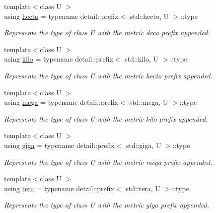 \begin{DoxyCompactItemize}
{\footnotesize template$<$class U $>$ }\\using \hyperlink{group___unit_manipulators_gaf3fc3cf9567ce9a93f880419c4ddac46}{hecto} = typename detail\+::prefix$<$ std\+::hecto, U $>$\+::type
\begin{DoxyCompactList}\small\item\em Represents the type of {\ttfamily class U} with the metric \textquotesingle{}deca\textquotesingle{} prefix appended. \end{DoxyCompactList}\item 
{\footnotesize template$<$class U $>$ }\\using \hyperlink{group___unit_manipulators_ga89965a45aaa6689548b9c53858759c5e}{kilo} = typename detail\+::prefix$<$ std\+::kilo, U $>$\+::type
\begin{DoxyCompactList}\small\item\em Represents the type of {\ttfamily class U} with the metric \textquotesingle{}hecto\textquotesingle{} prefix appended. \end{DoxyCompactList}\item 
{\footnotesize template$<$class U $>$ }\\using \hyperlink{group___unit_manipulators_gab1e685fcf4dd9478ed3d688f7af50842}{mega} = typename detail\+::prefix$<$ std\+::mega, U $>$\+::type
\begin{DoxyCompactList}\small\item\em Represents the type of {\ttfamily class U} with the metric \textquotesingle{}kilo\textquotesingle{} prefix appended. \end{DoxyCompactList}\item 
{\footnotesize template$<$class U $>$ }\\using \hyperlink{group___unit_manipulators_ga4595911f659ef61133216da15d61eb07}{giga} = typename detail\+::prefix$<$ std\+::giga, U $>$\+::type
\begin{DoxyCompactList}\small\item\em Represents the type of {\ttfamily class U} with the metric \textquotesingle{}mega\textquotesingle{} prefix appended. \end{DoxyCompactList}\item 
{\footnotesize template$<$class U $>$ }\\using \hyperlink{group___unit_manipulators_ga9f187b866f1123e65db38a5fbd745698}{tera} = typename detail\+::prefix$<$ std\+::tera, U $>$\+::type
\begin{DoxyCompactList}\small\item\em Represents the type of {\ttfamily class U} with the metric \textquotesingle{}giga\textquotesingle{} prefix appended. \end{DoxyCompactList}\item 

\end{DoxyCompactItemize}
